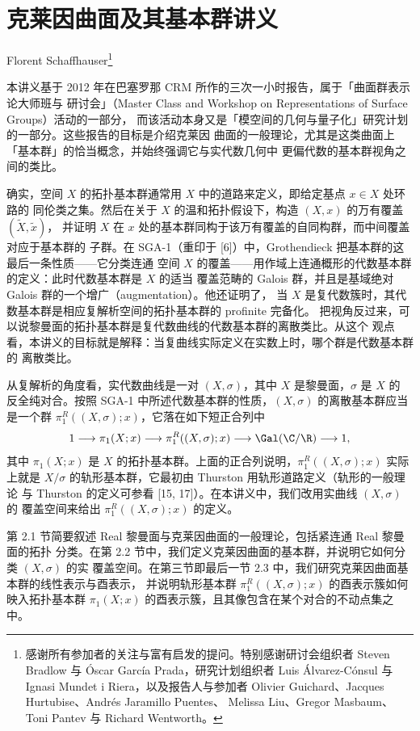 \chapter{克莱因曲面及其基本群讲义}
\label{chap:02}

\noindent Florent Schaffhauser\footnote{感谢所有参加者的关注与富有启发的提问。特别感谢研讨会组织者
Steven Bradlow 与 Óscar García Prada，研究计划组织者 Luis Álvarez-Cónsul 与 Ignasi Mundet i
Riera，以及报告人与参加者 Olivier Guichard、Jacques Hurtubise、Andrés Jaramillo Puentes、
Melissa Liu、Gregor Masbaum、Toni Pantev 与 Richard Wentworth。}

本讲义基于 2012 年在巴塞罗那 CRM 所作的三次一小时报告，属于「曲面群表示论大师班与
研讨会」（Master Class and Workshop on Representations of Surface Groups）活动的一部分，
而该活动本身又是「模空间的几何与量子化」研究计划的一部分。这些报告的目标是介绍克莱因
曲面的一般理论，尤其是这类曲面上「基本群」的恰当概念，并始终强调它与实代数几何中
更偏代数的基本群视角之间的类比。

确实，空间 $X$ 的拓扑基本群通常用 $X$ 中的道路来定义，即给定基点 $x\in X$ 处环路的
同伦类之集。然后在关于 $X$ 的温和拓扑假设下，构造 $(X,x)$ 的万有覆盖 $(\tilde X,\tilde x)$，
并证明 $X$ 在 $x$ 处的基本群同构于该万有覆盖的自同构群，而中间覆盖对应于基本群的
子群。在 SGA-1（重印于 [6]）中，Grothendieck 把基本群的这最后一条性质——它分类连通
空间 $X$ 的覆盖——用作域上连通概形的代数基本群的定义：此时代数基本群是 $X$ 的适当
覆盖范畴的 Galois 群，并且是基域绝对 Galois 群的一个增广（augmentation）。他还证明了，
当 $X$ 是复代数簇时，其代数基本群是相应复解析空间的拓扑基本群的 profinite 完备化。
把视角反过来，可以说黎曼面的拓扑基本群是复代数曲线的代数基本群的离散类比。从这个
观点看，本讲义的目标就是解释：当复曲线实际定义在实数上时，哪个群是代数基本群的
离散类比。

从复解析的角度看，实代数曲线是一对 $(X,\sigma)$，其中 $X$ 是黎曼面，$\sigma$ 是 $X$ 的
反全纯对合。按照 SGA-1 中所述代数基本群的性质，$(X,\sigma)$ 的离散基本群应当是一个群
$\pi^R_1((X,\sigma);x)$，它落在如下短正合列中
\[
1\longrightarrow \pi_1(X;x)\longrightarrow \pi^R_1((X,\sigma);x)
\longrightarrow \Gal(\C/\R)\longrightarrow 1,
\]
其中 $\pi_1(X;x)$ 是 $X$ 的拓扑基本群。上面的正合列说明，$\pi^R_1((X,\sigma);x)$
实际上就是 $X/\sigma$ 的轨形基本群，它最初由 Thurston 用轨形道路定义（轨形的一般理论
与 Thurston 的定义可参看 [15, 17]）。在本讲义中，我们改用实曲线 $(X,\sigma)$ 的
覆盖空间来给出 $\pi^R_1((X,\sigma);x)$ 的定义。

第 2.1 节简要叙述 Real 黎曼面与克莱因曲面的一般理论，包括紧连通 Real 黎曼面的拓扑
分类。在第 2.2 节中，我们定义克莱因曲面的基本群，并说明它如何分类 $(X,\sigma)$ 的实
覆盖空间。在第三节即最后一节 2.3 中，我们研究克莱因曲面基本群的线性表示与酉表示，
并说明轨形基本群 $\pi^R_1((X,\sigma);x)$ 的酉表示簇如何映入拓扑基本群
$\pi_1(X;x)$ 的酉表示簇，且其像包含在某个对合的不动点集之中。

